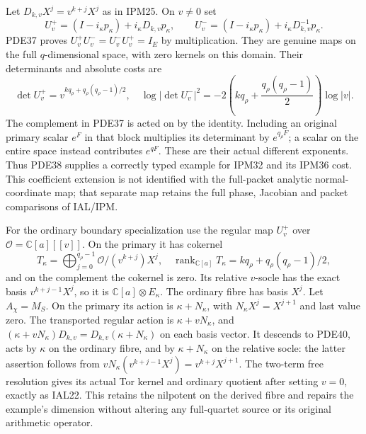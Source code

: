 Let $D_{k,v}X^j=v^{k+j}X^j$ as in IPM25. On $v\ne0$ set
\[
 U_v^+=(I-i_\kappa p_\kappa)+i_\kappa D_{k,v}p_\kappa,
 \qquad
 U_v^-=(I-i_\kappa p_\kappa)+i_\kappa D_{k,v}^{-1}p_\kappa.
 \tag{PDE38}
\]
PDE37 proves $U_v^+U_v^-=U_v^-U_v^+=I_E$ by multiplication.
They are genuine maps on the full $q$-dimensional space, with zero
kernels on this domain. Their determinants and absolute costs are
\[
 \det U_v^+=v^{kq_\rho+q_\rho(q_\rho-1)/2},\quad
 \log|\det U_v^-|^2
       =-2\left(kq_\rho+\frac{q_\rho(q_\rho-1)}2\right)\log|v|.
 \tag{PDE39}
\]
The complement in PDE37 is acted on by the identity. Including an
original primary scalar $e^F$ in that block multiplies its determinant
by $e^{q_\rho F}$; a scalar on the entire space instead contributes
$e^{qF}$. These are their actual different exponents.
Thus PDE38 supplies a correctly typed example for IPM32 and its
IPM36 cost. This coefficient extension is not identified with the
full-packet analytic normal-coordinate map; that separate map retains
the full phase, Jacobian and packet comparisons of IAL/IPM.

For the ordinary boundary specialization use the regular map $U_v^+$
over $\mathcal O=\mathbb{C}[a][[v]]$. On the primary it has cokernel
\[
 T_\kappa=\bigoplus_{j=0}^{q_\rho-1}
                       \mathcal O/(v^{k+j})X^j,
 \quad \operatorname{rank}_{\mathbb{C}[a]}T_\kappa
                     =kq_\rho+q_\rho(q_\rho-1)/2,
 \tag{PDE40}
\]
and on the complement the cokernel is zero. Its relative $v$-socle
has the exact basis $v^{k+j-1}X^j$, so it is
$\mathbb{C}[a]\otimes E_\kappa$. The ordinary fibre has basis $X^j$.
Let $A_\chi=M_S$. On the primary its action is $\kappa+N_\kappa$,
with $N_\kappa X^j=X^{j+1}$ and last value zero.
The transported regular action is $\kappa+vN_\kappa$, and
$(\kappa+vN_\kappa)D_{k,v}=D_{k,v}(\kappa+N_\kappa)$
on each basis vector. It descends to PDE40, acts by $\kappa$ on
the ordinary fibre, and by $\kappa+N_\kappa$ on the relative socle:
the latter assertion follows from
$vN_\kappa(v^{k+j-1}X^j)=v^{k+j}X^{j+1}$.
The two-term free resolution gives its actual Tor kernel and ordinary
quotient after setting $v=0$, exactly as IAL22. This retains the
nilpotent on the derived fibre and repairs the example's dimension
without altering any full-quartet source or its original arithmetic
operator.
